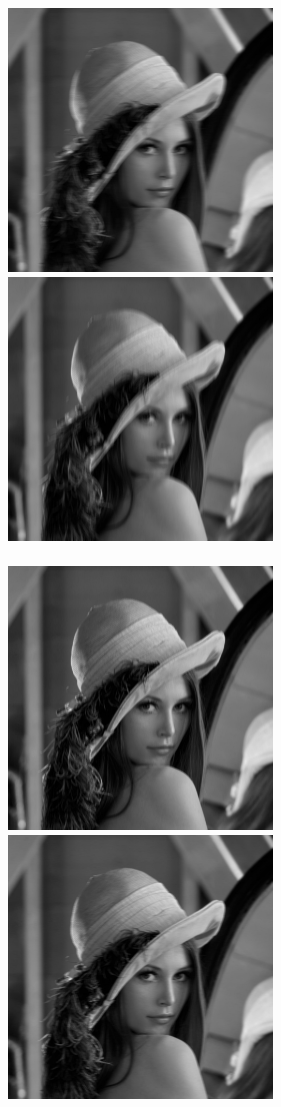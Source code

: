 \documentclass[a4paper,12pt,openany]{report}
\begin{document}
\begin{center}
\\
\includegraphics[width=7cm]{resources/modified/lena/lena_blur_3x40.jpg}
\includegraphics[width=7cm]{resources/modified/lena/lena_blur_40x3.jpg}
\\
\\
\includegraphics[width=7cm]{resources/modified/lena/lena_blur_20x3.jpg}
\includegraphics[width=7cm]{resources/modified/lena/lena_blur_3x20.jpg}

\end{center}
\end{document}
